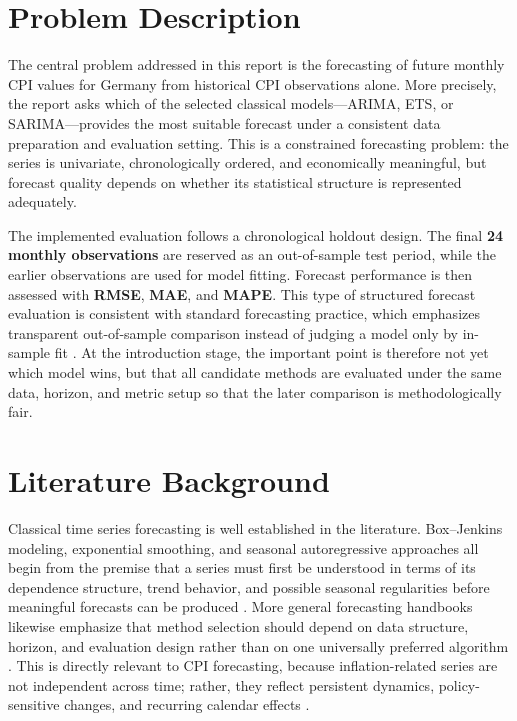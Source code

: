 \section{Problem Description}
The central problem addressed in this report is the forecasting of future monthly CPI values for Germany from historical CPI observations alone. More precisely, the report asks which of the selected classical models---ARIMA, ETS, or SARIMA---provides the most suitable forecast under a consistent data preparation and evaluation setting. This is a constrained forecasting problem: the series is univariate, chronologically ordered, and economically meaningful, but forecast quality depends on whether its statistical structure is represented adequately.

The implemented evaluation follows a chronological holdout design. The final \textbf{24 monthly observations} are reserved as an out-of-sample test period, while the earlier observations are used for model fitting. Forecast performance is then assessed with \textbf{RMSE}, \textbf{MAE}, and \textbf{MAPE}. This type of structured forecast evaluation is consistent with standard forecasting practice, which emphasizes transparent out-of-sample comparison instead of judging a model only by in-sample fit \cite{Armstrong:2001,Makridakis:2018}. At the introduction stage, the important point is therefore not yet which model wins, but that all candidate methods are evaluated under the same data, horizon, and metric setup so that the later comparison is methodologically fair.

\section{Literature Background}
Classical time series forecasting is well established in the literature. Box--Jenkins modeling, exponential smoothing, and seasonal autoregressive approaches all begin from the premise that a series must first be understood in terms of its dependence structure, trend behavior, and possible seasonal regularities before meaningful forecasts can be produced \cite{Box2015,Hamilton1994,Hyndman2021,Shumway2017}. More general forecasting handbooks likewise emphasize that method selection should depend on data structure, horizon, and evaluation design rather than on one universally preferred algorithm \cite{Armstrong:2001,Makridakis:2018}. This is directly relevant to CPI forecasting, because inflation-related series are not independent across time; rather, they reflect persistent dynamics, policy-sensitive changes, and recurring calendar effects \cite{StockWatson1999}.

